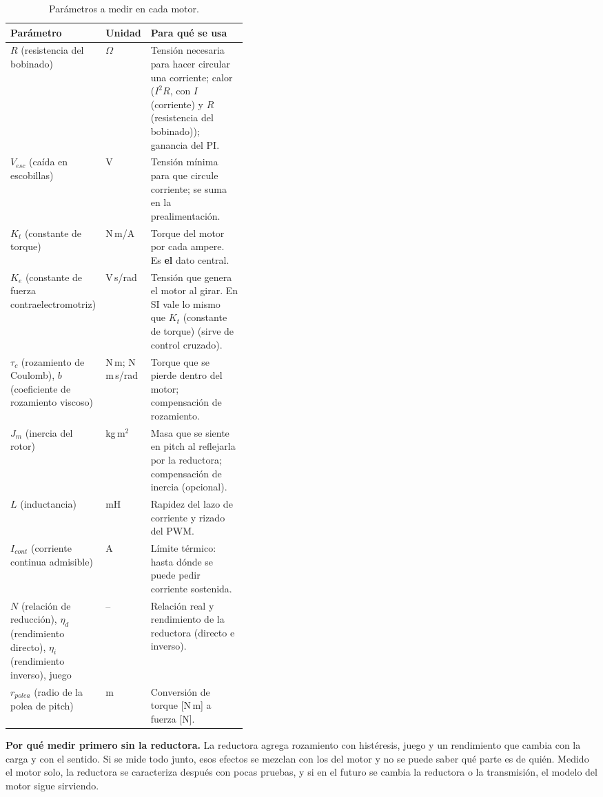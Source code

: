 \documentclass[11pt,a4paper]{article}
\begin{document}
\begin{table}[h]
\centering
\begin{tabularx}{\linewidth}{>{\raggedright\arraybackslash}p{0.27\linewidth}>{\raggedright\arraybackslash}p{0.13\linewidth}X}
\toprule
Parámetro & Unidad & Para qué se usa \\
\midrule
$R$ (resistencia del bobinado) & $\Omega$ & Tensión necesaria para hacer circular una corriente; calor ($I^2R$, con $I$ (corriente) y $R$ (resistencia del bobinado)); ganancia del PI. \\
$V_{esc}$ (caída en escobillas) & V & Tensión mínima para que circule corriente; se suma en la prealimentación. \\
$K_t$ (constante de torque) & N\,m/A & Torque del motor por cada ampere. Es \textbf{el} dato central. \\
$K_e$ (constante de fuerza contraelectromotriz) & V\,s/rad & Tensión que genera el motor al girar. En SI vale lo mismo que $K_t$ (constante de torque) (sirve de control cruzado). \\
$\tau_c$ (rozamiento de Coulomb), $b$ (coeficiente de rozamiento viscoso) & N\,m; N\,m\,s/rad & Torque que se pierde dentro del motor; compensación de rozamiento. \\
$J_m$ (inercia del rotor) & kg\,m$^2$ & Masa que se siente en pitch al reflejarla por la reductora; compensación de inercia (opcional). \\
$L$ (inductancia) & mH & Rapidez del lazo de corriente y rizado del PWM. \\
$I_{cont}$ (corriente continua admisible) & A & Límite térmico: hasta dónde se puede pedir corriente sostenida. \\
\midrule
$N$ (relación de reducción), $\eta_d$ (rendimiento directo), $\eta_i$ (rendimiento inverso), juego & -- & Relación real y rendimiento de la reductora (directo e inverso). \\
$r_{polea}$ (radio de la polea de pitch) & m & Conversión de torque [N\,m] a fuerza [N]. \\
\bottomrule
\end{tabularx}
\caption{Parámetros a medir en cada motor.}
\label{tab:parametros}
\end{table}

\textbf{Por qué medir primero sin la reductora.} La reductora agrega rozamiento con histéresis, juego y un rendimiento que cambia con la carga y con el sentido. Si se mide todo junto, esos efectos se mezclan con los del motor y no se puede saber qué parte es de quién. Medido el motor solo, la reductora se caracteriza después con pocas pruebas, y si en el futuro se cambia la reductora o la transmisión, el modelo del motor sigue sirviendo.
\end{document}
